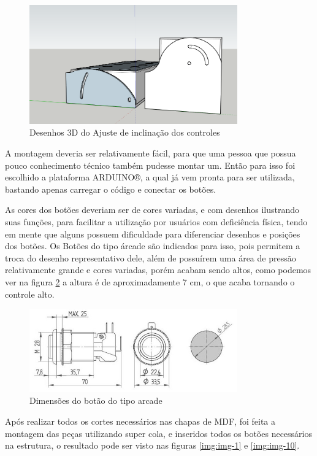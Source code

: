 \documentclass[
	12pt,			%
	openright,		%
	oneside,			%
	a4paper,			%
	chapter=TITLE,		%
	english,			%
	brazil,			%
	]{abntex2}
\begin{document}
\begin{figure}[H]
	\centering
		\includegraphics[width=0.8\textwidth]{./img/img-18.png}
		\caption{Desenhos 3D do Ajuste de inclinação dos controles}
		\label{img:img-18}
\end{figure}

A montagem deveria ser relativamente fácil, para que uma pessoa que possua pouco conhecimento técnico também pudesse montar um. Então para isso foi escolhido a plataforma ARDUINO®, a qual já vem pronta para ser utilizada, bastando apenas carregar o código e conectar os botões.

As cores dos botões deveriam ser de cores variadas, e com desenhos ilustrando suas funções, para facilitar a utilização por usuários com deficiência física, tendo em mente que alguns possuem dificuldade para diferenciar desenhos e posições dos botões. Os Botões do tipo árcade são indicados para isso, pois permitem a troca do desenho representativo dele, além de possuírem uma área de pressão relativamente grande e cores variadas, porém acabam sendo altos, como podemos ver na figura \ref{img:img-13} a altura é de aproximadamente 7 cm, o que acaba tornando o controle alto.

\begin{figure}[H]
	\centering
		\includegraphics[width=0.8\textwidth]{./img/img-13.jpg}
		\caption{Dimensões do botão do tipo arcade}
		\label{img:img-13}
\end{figure}

Após realizar todos os cortes necessários nas chapas de MDF, foi feita a montagem das peças utilizando super cola, e inseridos todos os botões necessários na estrutura, o resultado pode ser visto nas figuras \ref{img:img-1} e \ref{img:img-10}.
\end{document}
